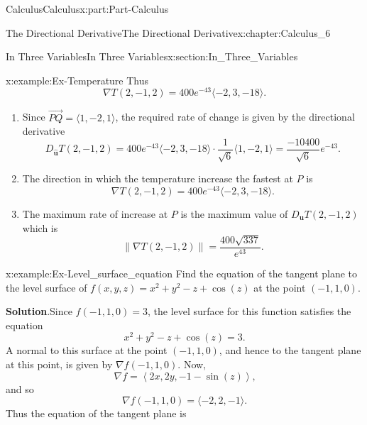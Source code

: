 \documentclass[oneside,10pt,]{book}
\newcommand{\blocktitlefont}{\relax}
\numberwithin{equation}{section}
\newcommand{\bm}[1]{\boldsymbol{#1}}
\begin{document}
\begin{partptx}{Calculus}{}{Calculus}{}{}{x:part:Part-Calculus}
\begin{chapterptx}{The Directional Derivative}{}{The Directional Derivative}{}{}{x:chapter:Calculus_6}
\begin{sectionptx}{In Three Variables}{}{In Three Variables}{}{}{x:section:In_Three_Variables}
\begin{example}{}{x:example:Ex-Temperature}
Thus%
\begin{equation*}
\nabla T (2,-1,2) = 400e^{-43} \langle -2, 3, -18 \rangle\text{.}
\end{equation*}
%
\par
%
\begin{enumerate}[label=\alph*]
\item{}Since \(\overrightarrow{PQ} = \langle 1, -2, 1 \rangle\), the required rate of change is given by the directional derivative%
\begin{equation*}
D_{\hat{\bm{u}}} T(2,-1,2) = 400 e^{-43} \langle -2, 3, -18 \rangle \cdot \dfrac{1}{\sqrt{6}} \langle 1, -2, 1 \rangle = \dfrac{-10400}{\sqrt{6}} e^{-43}\text{.}
\end{equation*}
%
\item{}The direction in which the temperature increase the fastest at \(P\) is%
\begin{equation*}
\nabla T (2,-1,2) = 400e^{-43} \langle -2, 3, -18 \rangle\text{.}
\end{equation*}
%
\item{}The maximum rate of increase at \(P\) is the maximum value of \(D_{\bm{u}} T(2,-1,2)\) which is%
\begin{equation*}
\| \nabla T (2,-1,2) \| = \dfrac{400 \sqrt{337}}{e^{43}}\text{.}
\end{equation*}
%
\end{enumerate}
%
\end{example}
\begin{example}{}{x:example:Ex-Level_surface_equation}%
Find the equation of the tangent plane to the level surface of \(f(x,y,z) = x^2+y^2 - z + \cos(z)\) at the point \((-1,1,0)\).%
\par\smallskip%
\noindent\textbf{\blocktitlefont Solution}.\hypertarget{g:solution:id552102}{}\quad{}Since \(f(-1,1,0) = 3\), the level surface for this function satisfies the equation%
\begin{equation*}
x^2+y^2 - z + \cos(z) = 3\text{.}
\end{equation*}
A normal to this surface at the point \((-1,1,0)\), and hence to the tangent plane at this point, is given by \(\nabla f (-1,1,0)\). Now,%
\begin{equation*}
\nabla f = \left \langle 2x, 2y, -1-\sin(z) \right \rangle\text{,}
\end{equation*}
and so%
\begin{equation*}
\nabla f (-1,1,0) = \langle-2, 2, -1 \rangle\text{.}
\end{equation*}
Thus the equation of the tangent plane is%

\end{example}
\end{sectionptx}
\end{chapterptx}
\end{partptx}
\end{document}

